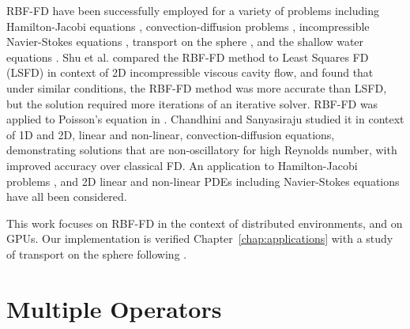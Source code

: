 \documentclass[11pt]{report}
\begin{document}
{%


RBF-FD have been successfully employed for a variety of problems including Hamilton-Jacobi equations \cite{Cecil2004}, convection-diffusion problems \cite{Chandhini2007, Stevens2009b},
incompressible Navier-Stokes equations \cite{Shu2003,Chinchapatnam2009}, transport on the sphere \cite{FornbergLehto11}, and the shallow water equations \cite{FlyerLehto11}.
Shu et al. \cite{Shu2006} compared the RBF-FD method to Least Squares FD (LSFD) in context of 2D incompressible viscous 
cavity flow, and found that under similar conditions, the RBF-FD method was more accurate than LSFD, but the solution required 
more iterations of an iterative solver. RBF-FD was applied to Poisson's 
equation in \cite{Wright2004}.  Chandhini and Sanyasiraju \cite{Chandhini2007} studied it in context of 1D and 2D, 
linear and non-linear, 
convection-diffusion equations, demonstrating solutions that are non-oscillatory for high Reynolds number, with improved 
accuracy over classical FD. An application to Hamilton-Jacobi problems \cite{Cecil2004}, and 2D linear and non-linear PDEs 
including Navier-Stokes equations \cite{Shu2003} have all been considered. 

This work focuses on RBF-FD in the context of distributed environments, and on GPUs. Our implementation is verified Chapter~\ref{chap:applications} with a study of transport on the sphere following \cite{FornbergLehto11}. 


\section{Multiple Operators}

}
\end{document}
